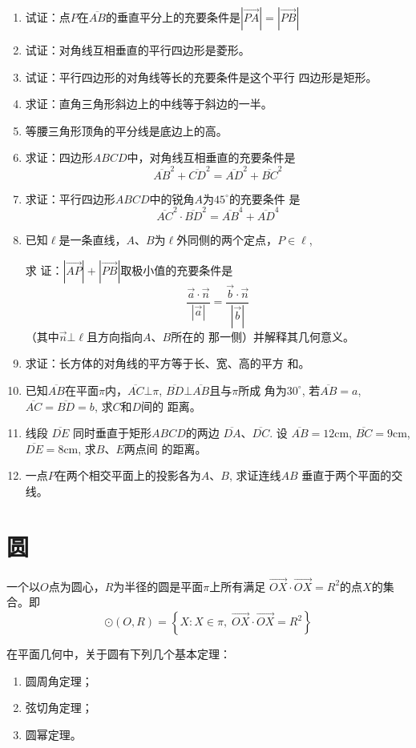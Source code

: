 \begin{enumerate}
    \item 试证：点$P$在$\overline{AB}$的垂直平分上的充要条件是$|\Vec{PA}|=|\Vec{PB}|$
\item 试证：对角线互相垂直的平行四边形是菱形。
\item 试证：平行四边形的对角线等长的充要条件是这个平行
四边形是矩形。
\item 求证：直角三角形斜边上的中线等于斜边的一半。
\item 等腰三角形顶角的平分线是底边上的高。
\item 求证：四边形$ABCD$中，对角线互相垂直的充要条件是
\[\overline{AB}^2 +\overline{CD}^2=\overline{AD}^2+\overline{BC}^2\]
\item 求证：平行四边形$ABCD$中的锐角$A$为$45^{\circ}$的充要条件
是$$\overline{AC}^2\cdot \overline{BD}^2=\overline{AB}^4+\overline{AD}^4$$
\item 已知$\ell$是一条直线，$A$、$B$为$\ell$外同侧的两个定点，$P\in\ell$, 

求
证：$|\Vec{AP}|+|\Vec{PB}|$取极小值的充要条件是
\[\frac{\vec{a}\cdot \vec{n}}{|\vec{a}|}=\frac{\vec{b}\cdot \vec{n}}{|\vec{b}|}\]
（其中$\vec{n}\bot \ell$且方向指向$A$、$B$所在的
那一侧）并解释其几何意义。
\item 求证：长方体的对角线的平方等于长、宽、高的平方
和。
\item 已知$\overline{AB}$在平面$\pi$内，$\overline{AC}\bot\pi$, $\overline{BD}\bot \overline{AB}$且与$\pi$所成
角为$30^{\circ}$, 若$\overline{AB}=a$, $\overline{AC}=\overline{BD}=b$, 求$C$和$D$间的
距离。
\item 线段
$\overline{DE}$
同时垂直于矩形$ABCD$的两边
$\overline{DA}$、$\overline{DC}$. 设
$\overline{AB}=12$cm, $\overline{BC}=9$cm, $\overline{DE}
=8$cm, 求$B$、$E$两点间
的距离。
\item 一点$P$在两个相交平面上的投影各为$A$、$B$, 求证连线$AB$
垂直于两个平面的交线。
\end{enumerate}


\section{圆}

一个以$O$点为圆心，$R$为半径的圆是平面$\pi$上所有满足
$\Vec{OX}\cdot\Vec{OX}=R^2$的点$X$的集合。即
\[\odot (O,R)=\left\{X:X\in \pi,\; \Vec{OX}\cdot\Vec{OX}=R^2\right\}\]

在平面几何中，关于圆有下列几个基本定理：
\begin{enumerate}
\item 圆周角定理；
\item 弦切角定理；
\item 圆幂定理。
\end{enumerate}

